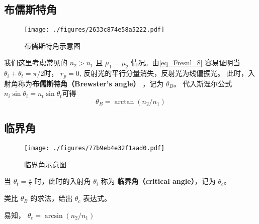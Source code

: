 \subsection{布儒斯特角}
\begin{figure}[ht]
\centering
\texttt{[image: ./figures/2633c874e58a5222.pdf]}
\caption{布儒斯特角示意图} \label{fig_Fresnl_2}
\end{figure}
我们这里考虑常见的 $n_2>n_1$ 且 $\mu_1 = \mu_2$ 情况。由\autoref{eq_Fresnl_8} 容易证明当 $\theta_i + \theta_t = \pi/2$时， $r_p = 0$, 反射光的平行分量消失，反射光为线偏振光。 此时，入射角称为\textbf{布儒斯特角（Brewster's angle）} ，记为 $\theta_B$。 代入斯涅尔公式 $n_i\sin\theta_i = n_t\sin\theta_t$可得
\begin{equation}
\theta_B = \arctan (n_2/n_1)
\end{equation}

\subsection{临界角}
\begin{figure}[ht]
\centering
\texttt{[image: ./figures/77b9eb4e32f1aad0.pdf]}
\caption{临界角示意图} \label{fig_Fresnl_3}
\end{figure}
\begin{definition}{}
当 $\theta_t  = \frac{\pi}{2}$ 时，此时的入射角 $\theta_i$ 称为 \textbf{临界角（critical angle）}，记为 $\theta_c$。
\end{definition}

\begin{exercise}{}
类比 $\theta_B$ 的求法，给出 $\theta_c$ 表达式。
\end{exercise}

易知， $\theta_c = \arcsin(n_2/n_1)$


